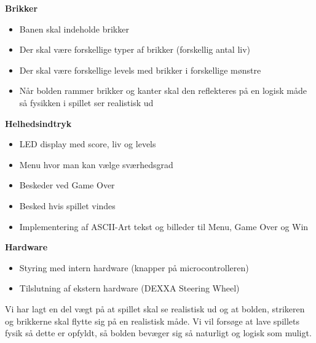\textbf{Brikker}
\begin{itemize}
\item Banen skal indeholde brikker
\item Der skal være forskellige typer af brikker (forskellig antal liv)
\item Der skal være forskellige levels med brikker i forskellige mønstre
\item Når bolden rammer brikker og kanter skal den reflekteres på en logisk måde så fysikken i spillet ser realistisk ud
\end{itemize}

\textbf{Helhedsindtryk}
\begin{itemize}
\item LED display med score, liv og levels
\item Menu hvor man kan vælge sværhedsgrad
\item Beskeder ved Game Over
\item Besked hvis spillet vindes
\item Implementering af ASCII-Art tekst og billeder til Menu, Game Over og Win
\end{itemize}

\textbf{Hardware}
\begin{itemize}
\item Styring med intern hardware (knapper på microcontrolleren)
\item Tilslutning af ekstern hardware (DEXXA Steering Wheel)
\end{itemize}

Vi har lagt en del vægt på at spillet skal se realistisk ud og at bolden, strikeren og brikkerne skal flytte sig på en realistisk måde. Vi vil forsøge at lave spillets fysik så dette er opfyldt, så bolden bevæger sig så naturligt og logisk som muligt. 
